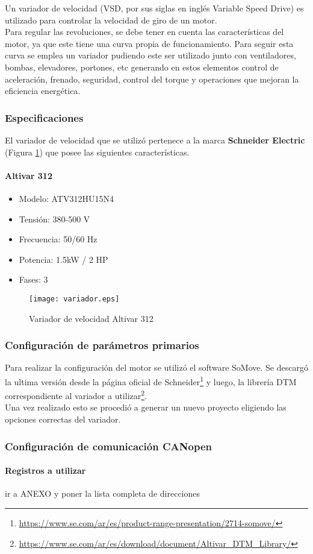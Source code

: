 Un variador de velocidad (VSD, por sus siglas en inglés Variable Speed Drive) es utilizado para controlar la velocidad de giro de un motor. \\
Para regular las revoluciones, se debe tener en cuenta las características del motor, ya que este tiene una curva propia de funcionamiento. Para seguir esta curva se emplea un variador pudiendo este ser utilizado junto con ventiladores, bombas, elevadores, portones, etc generando en estos elementos control de aceleración, frenado, seguridad, control del torque y operaciones que mejoran la eficiencia energética.

\subsubsection{Especificaciones}
El variador de velocidad que se utilizó pertenece a la marca \textbf{Schneider Electric} (Figura \ref{fig:variador}) que posee las siguientes características. \\
	\paragraph*{Altivar 312}
	\begin{itemize}
		\item 	Modelo: ATV312HU15N4
		\item   Tensión: 380-500 V
		\item 	Frecuencia: 50/60 Hz
		\item 	Potencia: 1.5kW / 2 HP
		\item 	Fases: 3
	\end{itemize}

	\begin{figure}[h!]
		\centering
		\texttt{[image: variador.eps]}
		\caption{Variador de velocidad Altivar 312}
		\label{fig:variador}
	\end{figure}


	\subsubsection{Configuración de parámetros primarios}
	Para realizar la configuración del motor se utilizó el software SoMove. Se descargó la ultima versión desde la página oficial de Schneider\footnote{\url{https://www.se.com/ar/es/product-range-presentation/2714-somove/}} y luego, la librería DTM correspondiente al variador a utilizar\footnote{\url{https://www.se.com/ar/es/download/document/Altivar_DTM_Library/}}. 
	\\
	Una vez realizado esto se procedió a generar un nuevo proyecto eligiendo las opciones correctas del variador.
	
	\subsubsection{Configuración de comunicación CANopen}

	\paragraph{Registros a utilizar}
	ir a ANEXO y poner la lista completa de direcciones

	\newpage

